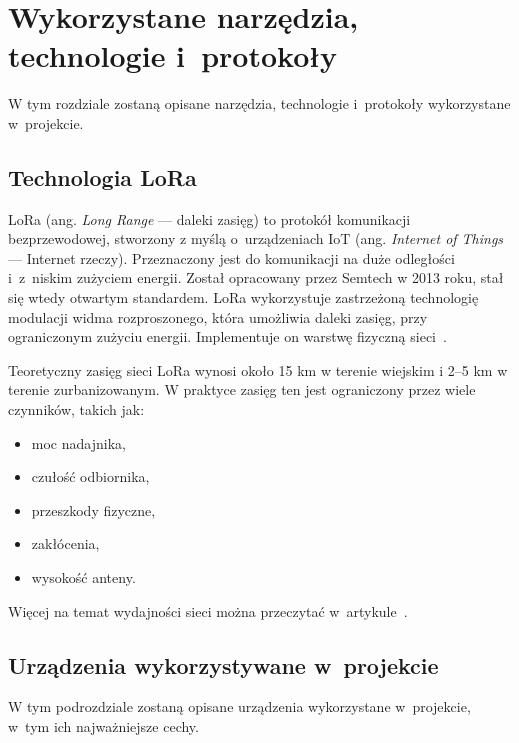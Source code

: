 
\chapter{Wykorzystane narzędzia, technologie i~protokoły}
W tym rozdziale zostaną opisane narzędzia, technologie i~protokoły wykorzystane w~projekcie.
\section{Technologia LoRa}
LoRa (ang. \emph{Long Range} — daleki zasięg) to protokół komunikacji bezprzewodowej, stworzony z myślą o~urządzeniach IoT (ang. \emph{Internet of Things} — Internet rzeczy).
Przeznaczony jest do komunikacji na duże odległości i~z~niskim zużyciem energii.
Został opracowany przez Semtech w 2013 roku, stał się wtedy otwartym standardem.
LoRa wykorzystuje zastrzeżoną technologię modulacji widma rozproszonego, która umożliwia daleki zasięg, przy ograniczonym zużyciu energii.
Implementuje on warstwę fizyczną sieci~\cite{lora:about}.

Teoretyczny zasięg sieci LoRa wynosi około 15 km w terenie wiejskim i 2--5 km w terenie zurbanizowanym.
W praktyce zasięg ten jest ograniczony przez wiele czynników, takich jak:
\begin{itemize}
    \item moc nadajnika,
    \item czułość odbiornika,
    \item przeszkody fizyczne,
    \item zakłócenia,
    \item wysokość anteny.
\end{itemize}


Więcej na temat wydajności sieci można przeczytać w~artykule~\cite{bib:lora-performance}.

\section{Urządzenia wykorzystywane w~projekcie}

W tym podrozdziale zostaną opisane urządzenia wykorzystane w~projekcie, w~tym ich najważniejsze cechy.

